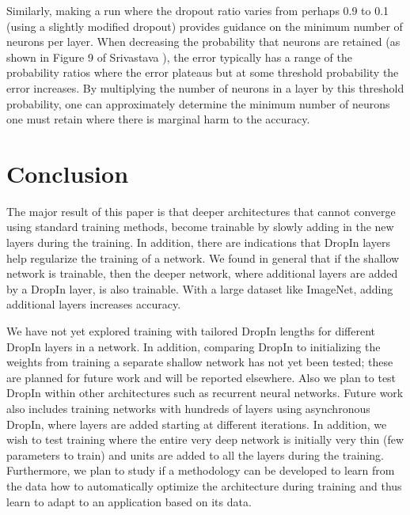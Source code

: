 \documentclass[10pt,twocolumn,letterpaper]{article}
\newcommand{\dropin}{DropIn }
\newcommand{\dropinNS}{DropIn}
\begin{document}
Similarly, making a run where the dropout ratio varies from perhaps 0.9 to 0.1 (using a slightly modified dropout) provides guidance on the minimum number of neurons per layer.
When decreasing the probability that neurons are retained (as shown in Figure 9 of Srivastava \etal \cite{srivastava2014dropout}), the error typically has a range of the probability ratios where the error plateaus but at some threshold probability the error increases.
By multiplying the number of neurons in a layer by this threshold probability, one can approximately determine the minimum number of neurons one must retain where there is marginal harm to the accuracy.




\section{Conclusion}

The major result of this paper is that deeper architectures that cannot converge using standard training methods, become trainable by slowly adding in the new layers during the training.  
In addition, there are indications that  \dropin layers help regularize the training of a network. 
We found in general that if the shallow network is trainable, then the deeper network, where  additional layers are added by a \dropin layer, is also trainable.  
With a large dataset like ImageNet, adding additional layers increases accuracy.

We have not yet explored training with tailored \dropin lengths for different \dropin layers in a network.
In addition, comparing \dropin to initializing the weights from training a separate shallow network has not yet been tested; these are planned for future work and will be reported elsewhere.  
Also we plan to test \dropin within other architectures such as recurrent neural networks.
Future work also includes training networks with hundreds of layers using asynchronous \dropinNS, where layers are added starting at different iterations.
In addition, we wish to test training where the entire very deep network is initially very thin (few parameters to train) and units are added to all the layers during the training.
Furthermore, we plan to study if a methodology can be developed to learn from the data how to automatically optimize the architecture during training and thus learn to adapt to an application based on its data.



{\small


}
\end{document}
